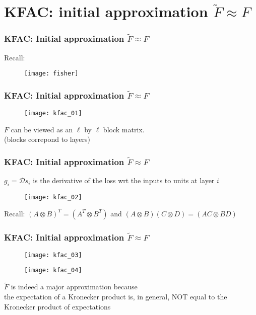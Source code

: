 \section{KFAC: initial approximation $\tilde{F} \approx F$}

\begin{frame}
\frametitle{KFAC: Initial approximation $\tilde{F} \approx F$}

Recall:
\begin{figure}
    \raggedright
    \texttt{[image: fisher]}
\end{figure}

\end{frame}

\begin{frame}
\frametitle{KFAC: Initial approximation $\tilde{F} \approx F$}

\begin{figure}
    \raggedright
    \texttt{[image: kfac\_01]}
\end{figure}

$F$ can be viewed as an $\ell$ by $\ell$ block matrix.\\
(blocks correpond to layers)
\end{frame}

\begin{frame}
\frametitle{KFAC: Initial approximation $\tilde{F} \approx F$}

$g_i = \mathcal{D}s_i$ is the derivative of the loss wrt the inputs to units at layer $i$
\begin{figure}
    \raggedright
    \texttt{[image: kfac\_02]}
\end{figure}

Recall: $(A \otimes B)^T = (A^T \otimes B^T)$ and $(A \otimes B) (C \otimes D) = (AC \otimes BD)$
\end{frame}

\begin{frame}
\frametitle{KFAC: Initial approximation $\tilde{F} \approx F$}

\begin{figure}
    \raggedright
    \texttt{[image: kfac\_03]}
\end{figure}

\begin{figure}
    \raggedright
    \texttt{[image: kfac\_04]}
\end{figure}

$\tilde{F}$ is indeed a major approximation because\\
the expectation of a Kronecker product is, in general, NOT
equal to the Kronecker product of expectations

\end{frame}


